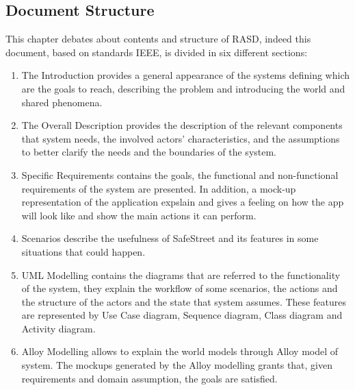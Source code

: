 \subsection{Document Structure}
This chapter debates about contents and structure of RASD, indeed this document, based on standards IEEE, is divided in six different sections:
\begin{enumerate}
\item	The Introduction provides a general appearance of the systems defining which are the goals to reach, describing the problem and introducing the world and shared phenomena.
\item The Overall Description provides the description of the relevant components that system needs, the involved actors’ characteristics, and the assumptions to better clarify the needs and the boundaries of the system. 
\item Specific Requirements contains the goals, the functional and non-functional requirements of the system are presented. In addition, a mock-up representation of the application expslain and gives a feeling on how the app will look like and show the main actions it can perform.
\item Scenarios describe the usefulness of SafeStreet and its features in some situations that could happen.
\item UML Modelling contains the diagrams that are referred to the functionality of the system, they explain the workflow of some scenarios, the actions and the structure of the actors and the state that system assumes. These features are represented by Use Case diagram, Sequence diagram, Class diagram and Activity diagram.
\item Alloy Modelling allows to explain the world models through Alloy model of system. The mockups generated by the Alloy modelling grants that, given requirements and domain assumption, the goals are satisfied.

\end{enumerate}
